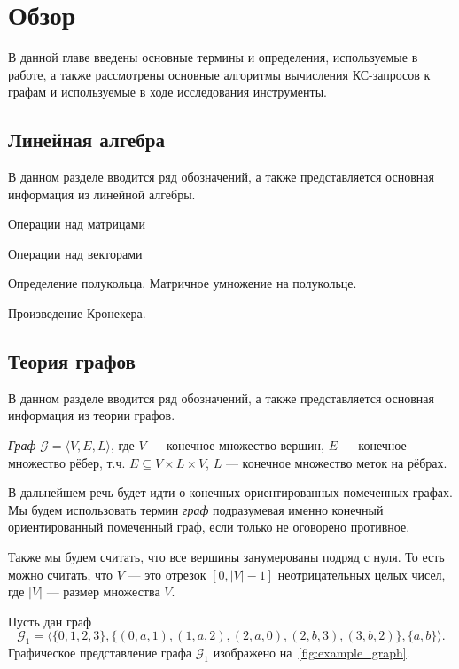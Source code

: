 \chapter{Обзор}\label{ch:ch1}
В данной главе введены основные термины и определения, используемые в работе, а также рассмотрены основные алгоритмы вычисления КС-запросов к графам и используемые в ходе исследования инструменты. 

\section{Линейная алгебра}
В данном разделе вводится ряд обозначений, а также представляется основная информация из линейной алгебры.

Операции над матрицами

Операции над векторами

Определение полукольца. Матричное умножение на полукольце.

Произведение Кронекера.

\section{Теория графов}\label{sec:ch1/sec1}
В данном разделе вводится ряд обозначений, а также представляется основная информация из теории графов.

\begin{definition}
	\textit{Граф} $\mathcal{G} = \langle V, E, L \rangle$, где $V$ --- конечное множество вершин, $E$ --- конечное множество рёбер, т.ч. $E \subseteq V \times L \times V$, $L$ --- конечное множество меток на рёбрах.
\end{definition}

В дальнейшем речь будет идти о конечных ориентированных помеченных графах.
Мы будем использовать термин \textit{граф} подразумевая именно конечный ориентированный помеченный граф, если только не оговорено противное.

Также мы будем считать, что все вершины занумерованы подряд с нуля.
То есть можно считать, что $V$ --- это отрезок $[0, |V| - 1]$ неотрицательных целых чисел, где $|V|$ --- размер множества $V$.

\begin{example}
	Пусть дан граф $$\mathcal{G}_1 = \langle \{0,1,2,3\}, \{(0,a,1), (1,a,2), (2,a,0), (2,b,3), (3,b,2)\}, \{a,b\} \rangle.$$
	Графическое представление графа $\mathcal{G}_1$ изображено на~\cref{fig:example_graph}.
\end{example}

